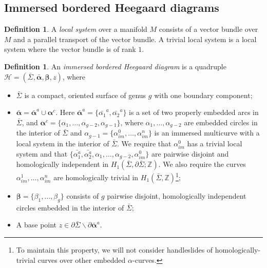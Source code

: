 \documentclass{amsart}
\theoremstyle{definition}
\newtheorem{defn}[thm]{Definition}
\theoremstyle{remark}
\numberwithin{equation}{section}
\numberwithin{equation}{section} \makeatletter
\begin{document}
\subsection{Immersed bordered Heegaard diagrams}\label{Subsection, immersed bordered Heegaard diagram}

\begin{defn}
A \textit{local system} over a manifold $M$ consists of a vector bundle over $M$ and a parallel transport of the vector bundle. A trivial local system is a local system where the vector bundle is of rank $1$.
\end{defn}
\begin{defn}
An \emph{immersed bordered Heegaard diagram} is a quadruple $\mathcal{H}=(\bar{\Sigma},\bm{\bar{\alpha}},\bm{\beta},z)$, where 
\begin{itemize}
\item[(1)]$\bar{\Sigma}$ is a compact, oriented surface of genus $g$ with one boundary component;
\item[(2)]$\bm{\bar{\alpha}}=\bm{\bar{\alpha}}^a\cup \bm{\alpha}^c$. Here $\bm{\bar{\alpha}}^a=\{\bar{\alpha_1}^a,\bar{\alpha_2}^a\}$ is a set of two properly embedded arcs in $\bar{\Sigma}$, and $\bm{\alpha}^c=\{\alpha_1,\ldots,\alpha_{g-2},\alpha_{g-1}\}$, where $\alpha_1,\ldots,\alpha_{g-2}$ are embedded circles in the interior of $\bar{\Sigma}$ and $\alpha_{g-1}=\{\alpha^0_{im},\ldots,\alpha^n_{im}\}$ is an immersed multicurve with a local system in the interior of $\bar{\Sigma}$. We require that $\alpha_{im}^0$ has a trivial local system and that $\{\bar{\alpha_1^a},\bar{\alpha_2^a},\alpha_1,\ldots,\alpha_{g-2},\alpha_{im}^0\}$ are pairwise disjoint and homologically independent in $H_1(\bar{\Sigma},\partial{\bar{\Sigma}};\mathbb{Z})$. We also require the curves $\alpha_{im}^1,\ldots,\alpha_{im}^{n}$ are homologically trivial in $H_1(\bar{\Sigma},\mathbb{Z})$\footnote{To maintain this property, we will not consider handleslides of homologically-trivial curves over other embedded $\alpha$-curves.};
\item[(3)]$\bm{\beta}=\{\beta_1,\ldots,\beta_g\}$ consists of $g$ pairwise disjoint, homologically independent circles embedded in the interior of $\bar{\Sigma}$;
\item[(4)]A base point $z\in\partial\bar{\Sigma}\backslash\partial\bar{\bm{\alpha}}^a$.
\end{itemize}
\end{defn}
\end{document}
